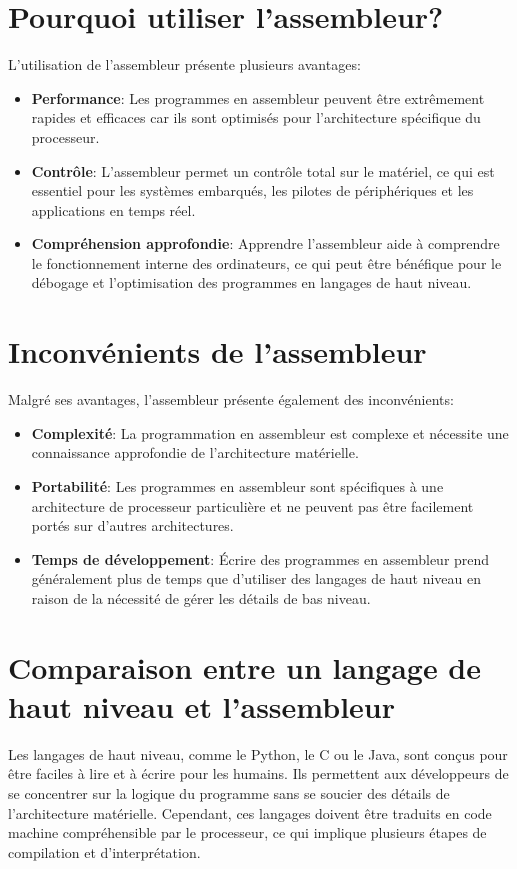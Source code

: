\documentclass[a4paper, 12pt]{report}
\begin{document}
\section{Pourquoi utiliser l'assembleur?}
L'utilisation de l'assembleur présente plusieurs avantages:
\begin{itemize}
  \item \textbf{Performance}: Les programmes en assembleur peuvent être extrêmement rapides et efficaces car ils sont optimisés pour l'architecture spécifique du processeur.
  \item \textbf{Contrôle}: L'assembleur permet un contrôle total sur le matériel, ce qui est essentiel pour les systèmes embarqués, les pilotes de périphériques et les applications en temps réel.
  \item \textbf{Compréhension approfondie}: Apprendre l'assembleur aide à comprendre le fonctionnement interne des ordinateurs, ce qui peut être bénéfique pour le débogage et l'optimisation des programmes en langages de haut niveau.
\end{itemize}

\section{Inconvénients de l'assembleur}
Malgré ses avantages, l'assembleur présente également des inconvénients:
\begin{itemize}
  \item \textbf{Complexité}: La programmation en assembleur est complexe et nécessite une connaissance approfondie de l'architecture matérielle.
  \item \textbf{Portabilité}: Les programmes en assembleur sont spécifiques à une architecture de processeur particulière et ne peuvent pas être facilement portés sur d'autres architectures.
  \item \textbf{Temps de développement}: Écrire des programmes en assembleur prend généralement plus de temps que d'utiliser des langages de haut niveau en raison de la nécessité de gérer les détails de bas niveau.
\end{itemize}

\section{Comparaison entre un langage de haut niveau et l'assembleur}
Les langages de haut niveau, comme le Python, le C ou le Java, sont conçus pour être faciles à lire et à écrire pour les humains. Ils permettent aux développeurs de se concentrer sur la logique du programme sans se soucier des détails de l'architecture matérielle. Cependant, ces langages doivent être traduits en code machine compréhensible par le processeur, ce qui implique plusieurs étapes de compilation et d'interprétation.
\end{document}
